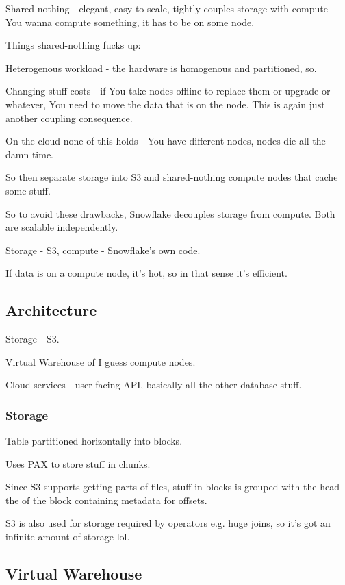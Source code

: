 \documentclass{article}
\begin{document}
		Shared nothing - elegant, easy to scale, tightly couples storage with compute - You wanna compute something, it has to be on some node.
		
		Things shared-nothing fucks up:
		
		Heterogenous workload - the hardware is homogenous and partitioned, so.
		
		Changing stuff costs - if You take nodes offline to replace them or upgrade or whatever, You need to move the data that is on the node. This is again just another coupling consequence.
		
		On the cloud none of this holds - You have different nodes, nodes die all the damn time.
		
		So then separate storage into S3 and shared-nothing compute nodes that cache some stuff.
		
		So to avoid these drawbacks, Snowflake decouples storage from compute. Both are scalable independently.
		
		Storage - S3, compute - Snowflake's own code.
		
		If data is on a compute node, it's hot, so in that sense it's efficient.
		
	\subsection{Architecture}
	
		Storage - S3.
		
		Virtual Warehouse of I guess compute nodes.
		
		Cloud services - user facing API, basically all the other database stuff.
		
		\subsubsection{Storage}
		
			Table partitioned horizontally into blocks.
			
			Uses PAX to store stuff in chunks.
			
			Since S3 supports getting parts of files, stuff in blocks is grouped with the head the of the block containing metadata for offsets.
			
			S3 is also used for storage required by operators e.g. huge joins, so it's got an infinite amount of storage lol.
			
	\subsection{Virtual Warehouse}
	
\end{document}
